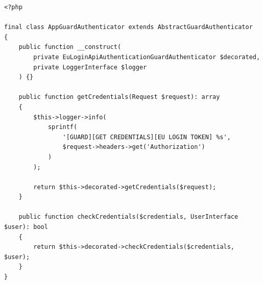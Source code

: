 \begin{frame}[fragile,c]
\end{frame}

\begin{frame}[fragile,c]
    \begin{lstlisting}
<?php

final class AppGuardAuthenticator extends AbstractGuardAuthenticator
{
    public function __construct(
        private EuLoginApiAuthenticationGuardAuthenticator $decorated,
        private LoggerInterface $logger
    ) {}

    public function getCredentials(Request $request): array
    {
        $this->logger->info(
            sprintf(
                '[GUARD][GET CREDENTIALS][EU LOGIN TOKEN] %s',
                $request->headers->get('Authorization')
            )
        );

        return $this->decorated->getCredentials($request);
    }

    public function checkCredentials($credentials, UserInterface $user): bool
    {
        return $this->decorated->checkCredentials($credentials, $user);
    }
}
    \end{lstlisting}
\end{frame}

\begin{frame}[fragile,c]
\end{frame}

